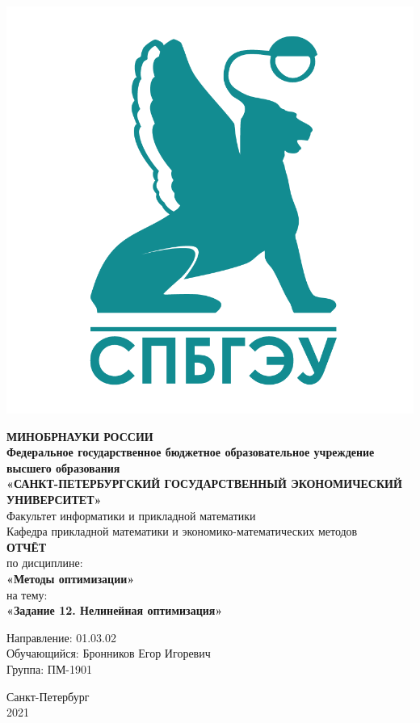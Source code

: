 \documentclass[14pt,a4paper,fleqn]{extarticle}
\begin{document}
	\begin{titlepage}
		\includegraphics[scale=0.12]{logo}
		\begin{center}
			\textbf{МИНОБРНАУКИ РОССИИ}\\
			\vspace{0.2cm}
			\textbf{Федеральное государственное бюджетное образовательное учреждение высшего образования}\\
			\textbf{«САНКТ-ПЕТЕРБУРГСКИЙ ГОСУДАРСТВЕННЫЙ ЭКОНОМИЧЕСКИЙ УНИВЕРСИТЕТ»}\\
			\vspace{0.6cm}
			Факультет информатики и прикладной математики\\
			Кафедра прикладной математики и экономико-математических методов\\
			\vspace{1cm}
			\textbf{ОТЧЁТ}\\
			по дисциплине:\\
			\textbf{«Методы оптимизации»}\\
			на тему:\\
			\textbf{«Задание 12. Нелинейная оптимизация»}\\
		\end{center}
		\vspace{1cm}
		Направление: 01.03.02\\
		Обучающийся: Бронников Егор Игоревич\\
		Группа: ПМ-1901\\
		\vfill
		\begin{center}
			Санкт-Петербург\\
			2021\\
		\end{center}
	\end{titlepage}
\end{document}
